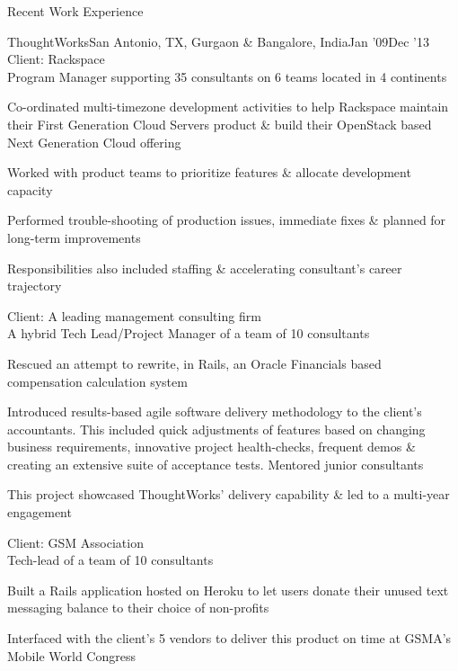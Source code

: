 \documentclass{resume} %
\begin{document}
\begin{rSection}{Recent Work Experience}
\begin{rSubsection}{ThoughtWorks}{San Antonio, TX, Gurgaon \& Bangalore, India}{Jan '09}{Dec '13}
    {Client: Rackspace
      \\Program Manager supporting 35 consultants on 6 teams located in 4 continents}

  \item Co-ordinated multi-timezone development activities to help Rackspace maintain their First Generation Cloud Servers product \& build their OpenStack based Next Generation Cloud offering
    \item Worked with product teams to prioritize features \& allocate development capacity
  \item Performed trouble-shooting of production issues, immediate fixes \& planned for long-term improvements
  \item Responsibilities also included staffing \& accelerating consultant's career trajectory
\end{rSubsection}\vspace{-1em}


\begin{rSubsection}{}{}{}{}
  {Client: A leading management consulting firm
    \\A hybrid Tech Lead/Project Manager of a team of 10 consultants}

\item Rescued an attempt to rewrite, in Rails, an Oracle Financials based compensation calculation system
\item Introduced results-based agile software delivery
  methodology to the client's accountants. This included quick
  adjustments of features based on changing business requirements, innovative
  project health-checks, frequent demos \& creating an extensive suite
  of acceptance tests. Mentored junior consultants
\item This project showcased ThoughtWorks' delivery capability \& led to a multi-year engagement

\end{rSubsection}\vspace{-1em}


\begin{rSubsection}{}{}{}{}{Client: GSM Association\\Tech-lead of a team of 10 consultants}
\item Built a Rails application hosted on Heroku to let users donate their unused text messaging balance to their choice of non-profits
  \item Interfaced with the client's 5 vendors to deliver this product on time at GSMA's Mobile World Congress 


\end{rSubsection}
\end{rSection}
\end{document}
